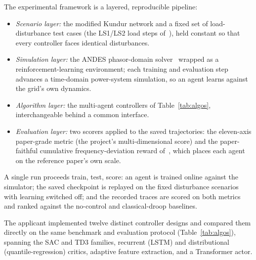 \documentclass[11pt,a4paper]{article}
\begin{document}
The experimental framework is a layered, reproducible pipeline:
\begin{itemize}
  \item \textit{Scenario layer:} the modified Kundur network and a fixed
        set of load-disturbance test cases (the LS1/LS2 load steps
        of~\cite{yang2023ddic}), held constant so that every controller
        faces identical disturbances.
  \item \textit{Simulation layer:} the ANDES phasor-domain
        solver~\cite{cui2021andes} wrapped as a reinforcement-learning
        environment; each training and evaluation step advances a
        time-domain power-system simulation, so an agent learns against
        the grid's own dynamics.
  \item \textit{Algorithm layer:} the multi-agent controllers of
        Table~\ref{tab:algos}, interchangeable behind a common
        interface.
  \item \textit{Evaluation layer:} two scorers applied to the saved
        trajectories: the eleven-axis paper-grade metric (the project's
        multi-dimensional score) and the paper-faithful cumulative
        frequency-deviation reward of~\cite{yang2023ddic}, which places
        each agent on the reference paper's own scale.
\end{itemize}
A single run proceeds train, test, score: an agent is trained online
against the simulator; the saved checkpoint is replayed on the fixed
disturbance scenarios with learning switched off; and the recorded
traces are scored on both metrics and ranked against the no-control and
classical-droop baselines.

The applicant implemented twelve distinct controller
designs and compared them directly on the same
benchmark and evaluation protocol (Table~\ref{tab:algos}), spanning the
SAC and TD3 families, recurrent (LSTM) and distributional
(quantile-regression) critics, adaptive feature extraction, and a
Transformer actor.
\end{document}
